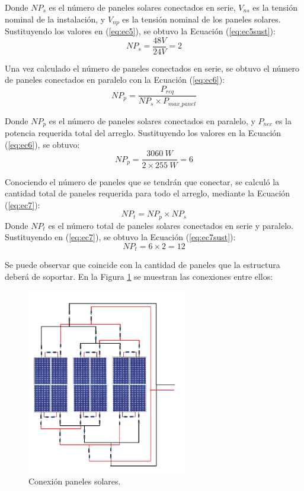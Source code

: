 Donde $NP_{s}$ es el número de paneles solares conectados en serie, $V_{ns}$ es la tensión nominal de la instalación, y $V_{np}$ es la tensión nominal de los paneles solares. Sustituyendo los valores en (\ref{eq:ec5}), se obtuvo la Ecuación (\ref{eq:ec5sust}):
\begin{equation}\label{eq:ec5sust}
NP_{s} = \frac{48 V}{24 V}=2 
\end{equation}

Una vez calculado el número de paneles conectados en serie, se obtuvo el número de paneles conectados en paralelo con la Ecuación (\ref{eq:ec6}):
\begin{equation}\label{eq:ec6}
NP_{p} =\frac{P_{req}}{NP_{s} \times P_{max\_panel}} 
\end{equation}

Donde $NP_{p}$ es el número de paneles solares conectados en paralelo, y $P_{nec}$ es la potencia requerida total del arreglo. Sustituyendo los valores en la Ecuación (\ref{eq:ec6}), se obtuvo:
\begin{equation}\label{eq:ec6sust}
NP_{p} = \frac{3060 \ W}{2 \times 255 \ W}=6 
\end{equation}

Conociendo el número de paneles que se tendrán que conectar, se calculó la cantidad total de paneles requerida para todo el arreglo, mediante la Ecuación (\ref{eq:ec7}): 
\begin{equation}\label{eq:ec7}
NP_{t} = NP_{p} \times NP_{s}  
\end{equation}
Donde $NP_{t}$ es el número total de paneles solares conectados en serie y paralelo. Sustituyendo en (\ref{eq:ec7}), se obtuvo la Ecuación (\ref{eq:ec7sust}):
\begin{equation}\label{eq:ec7sust}
NP_{t} = 6 \times 2 = 12  
\end{equation}

Se puede observar que coincide con la cantidad de paneles que la estructura deberá de soportar. En la Figura \ref{fig:Dispan} se muestran las conexiones entre ellos:
\begin{figure}[H]
	\centering
	\includegraphics[width=7cm]{imagenes/Dispan}
	\caption{Conexión paneles solares.}
	\label{fig:Dispan}
\end{figure}

